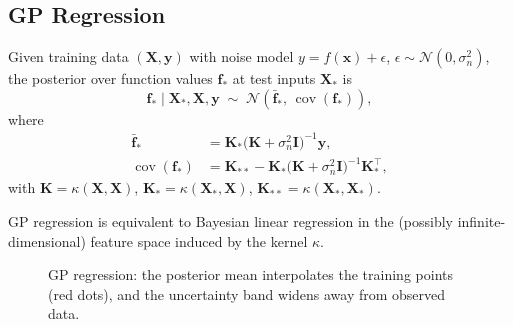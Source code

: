 \subsection{GP Regression}

\begin{theorem}[GP Posterior]
Given training data $(\bm{X},\bm{y})$ with noise model $y=f(\bm{x})+\epsilon$, $\epsilon\sim\mathcal{N}(0,\sigma_n^2)$, the posterior over function values $\bm{f}_*$ at test inputs $\bm{X}_*$ is
\[
  \bm{f}_*\mid\bm{X}_*,\bm{X},\bm{y} \;\sim\; \mathcal{N}(\bar{\bm{f}}_*,\,\operatorname{cov}(\bm{f}_*)),
\]
where
\begin{align}
  \bar{\bm{f}}_* &= \bm{K}_{*}\bigl(\bm{K}+\sigma_n^2\bm{I}\bigr)^{-1}\bm{y}, \label{eq:gp-mean}\\
  \operatorname{cov}(\bm{f}_*) &= \bm{K}_{**} - \bm{K}_{*}\bigl(\bm{K}+\sigma_n^2\bm{I}\bigr)^{-1}\bm{K}_{*}^\top, \label{eq:gp-cov}
\end{align}
with $\bm{K}=\kappa(\bm{X},\bm{X})$, $\bm{K}_*=\kappa(\bm{X}_*,\bm{X})$, $\bm{K}_{**}=\kappa(\bm{X}_*,\bm{X}_*)$.
\end{theorem}

\begin{remark}
GP regression is equivalent to Bayesian linear regression in the (possibly infinite-dimensional) feature space induced by the kernel $\kappa$.
\end{remark}

\begin{figure}[ht]
\centering
{}
\caption{GP regression: the posterior mean interpolates the training points (red dots), and the uncertainty band widens away from observed data.}
\label{fig:gp-regression}
\end{figure}

